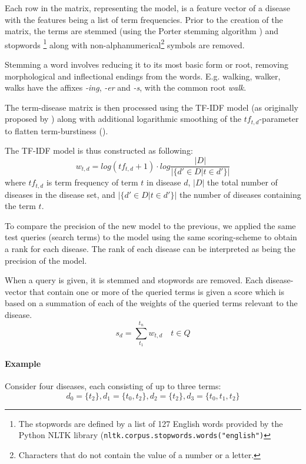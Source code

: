 \documentclass[10pt,letterpaper,final]{article}
\begin{document}

Each row in the matrix, representing the model, is a feature vector of a
disease with the features being a list of term frequencies. Prior to the
creation of the matrix, the terms are stemmed (using the Porter stemming
algorithm \cite{porterstemming}) and stopwords \footnote{The stopwords
are defined by a list of 127 English words provided by the Python NLTK
library (\texttt{nltk.corpus.stopwords.words("english")}} along with
non-alphanumerical\footnote{Characters that do not contain the value of
a number or a letter.} symbols are removed.

Stemming a word involves reducing it to its most basic form or root,
removing morphological and inflectional endings from the words. E.g.
walking, walker, walks have the affixes \textit{-ing}, \textit{-er} and
\textit{-s}, with the common root \textit{walk}.


The term-disease matrix is then processed using the
TF-IDF model (as originally proposed by \cite{tfidf}) along with
additional logarithmic smoothing of the $tf_{t,d}$-parameter to flatten
term-burstiness (\cite{burstiness}).

The TF-IDF model is thus constructed as following:
\[
w_{t,d} = log(tf_{t,d}+1)\cdot log\frac{|D|}{|\{d'\in D|t\in d'\}|}
\]
where $tf_{t,d}$ is term frequency of term $t$ in disease $d$, $|D|$ 
the total number of diseases in the disease set, and $|\{d'\in D|t\in
d'\}|$ the number of diseases containing the term $t$.

To compare the precision of the new model to the previous, we applied
the same test queries (search terms) to the model using the same
scoring-scheme to obtain a rank for each disease. The rank of each
disease can be interpreted as being the precision of the model.

When a query is given, it is stemmed and stopwords are removed. Each
disease-vector that contain one or more of the queried terms is given a
score which is based on a summation of each of the weights of the
queried terms relevant to the disease.
\[
s_{d} = \displaystyle\sum\limits_{t_1}^{t_n} w_{t,d}\quad t \in Q
\]

\paragraph{Example}
Consider four diseases, each consisting of up to three terms:
\[
d_{0} = \{t_{2}\}, d_{1} = \{t_{0}, t_{2} \}, d_{2} = \{t_{2} \}, d_{3} = \{t_{0}, t_{1}, t_{2} \}
\]
\end{document}
